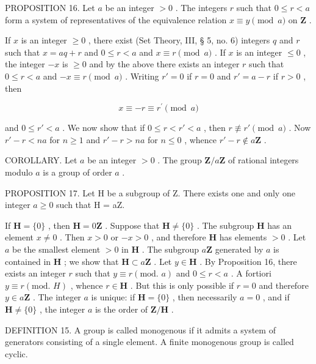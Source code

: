 PROPOSITION 16. Let \(a\) be an integer \(>0\) . The integers \(r\) such that \(0 \leqslant r < a\) form a system of representatives of the equivalence relation \(x \equiv y \pmod{a}\) on \(\mathbf{Z}\) .

If \(x\) is an integer \(\geqslant 0\) , there exist (Set Theory, III, § 5, no. 6) integers \(q\) and \(r\) such that \(x = aq + r\) and \(0 \leqslant r < a\) and \(x \equiv r \pmod{a}\) . If \(x\) is an integer \(\leqslant 0\) , the integer \(-x\) is \(\geqslant 0\) and by the above there exists an integer \(r\) such that \(0 \leqslant r < a\) and \(-x \equiv r \pmod{a}\) . Writing \(r' = 0\) if \(r = 0\) and \(r' = a - r\) if \(r > 0\) , then

\[
x \equiv - r \equiv r ^ {\prime} \pmod {a}
\]

and \(0 \leqslant r' < a\) . We now show that if \(0 \leqslant r < r' < a\) , then \(r \not\equiv r' \pmod{a}\) . Now \(r' - r < na\) for \(n \geqslant 1\) and \(r' - r > na\) for \(n \leqslant 0\) , whence \(r' - r \notin a\mathbf{Z}\) .

COROLLARY. Let \(a\) be an integer \(> 0\) . The group \(\mathbf{Z} / a\mathbf{Z}\) of rational integers modulo \(a\) is a group of order \(a\) .

PROPOSITION 17. Let H be a subgroup of Z. There exists one and only one integer \(a \geqslant 0\) such that H = aZ.

If \(\mathbf{H} = \{0\}\) , then \(\mathbf{H} = 0\mathbf{Z}\) . Suppose that \(\mathbf{H} \neq \{0\}\) . The subgroup \(\mathbf{H}\) has an element \(x \neq 0\) . Then \(x > 0\) or \(-x > 0\) , and therefore \(\mathbf{H}\) has elements \(>0\) . Let \(a\) be the smallest element \(>0\) in \(\mathbf{H}\) . The subgroup \(a\mathbf{Z}\) generated by \(a\) is contained in \(\mathbf{H}\) ; we show that \(\mathbf{H} \subset a\mathbf{Z}\) . Let \(y \in \mathbf{H}\) . By Proposition 16, there exists an integer \(r\) such that \(y \equiv r (\text{mod. } a)\) and \(0 \leqslant r < a\) . A fortiori \(y \equiv r (\text{mod. } H)\) , whence \(r \in \mathbf{H}\) . But this is only possible if \(r = 0\) and therefore \(y \in a\mathbf{Z}\) . The integer \(a\) is unique: if \(\mathbf{H} = \{0\}\) , then necessarily \(a = 0\) , and if \(\mathbf{H} \neq \{0\}\) , the integer \(a\) is the order of \(\mathbf{Z}/\mathbf{H}\) .

DEFINITION 15. A group is called monogenous if it admits a system of generators consisting of a single element. A finite monogenous group is called cyclic.


